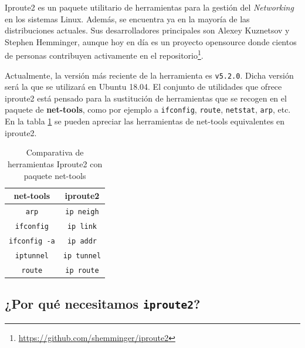 Iproute2 es un paquete utilitario de herramientas para la gestión del \textit{Networking} en los sistemas Linux. Además, se encuentra ya en la mayoría de las distribuciones actuales. Sus desarrolladores principales son Alexey Kuznetsov y Stephen Hemminger, aunque hoy en día es un proyecto opensource donde cientos de personas contribuyen activamente en el repositorio\footnote{\url{https://github.com/shemminger/iproute2}}.  \\
\par
Actualmente, la versión más reciente de la herramienta es \texttt{v5.2.0}. Dicha versión será la que se utilizará en Ubuntu 18.04. El conjunto de utilidades que ofrece iproute2 está pensado para la sustitución de herramientas que se recogen en el paquete de \textbf{net-tools}, como por ejemplo a \texttt{ifconfig}, \texttt{route}, \texttt{netstat}, \texttt{arp}, etc. En la tabla \ref{tab:ipNettools} se pueden apreciar las herramientas de net-tools equivalentes en iproute2.

\begin{table}[ht]
    \centering
    \begin{tabular}{|c|c|}
        \hline
        \rowcolor[HTML]{C0C0C0}
        {\color[HTML]{000000} \textbf{net-tools}} & {\color[HTML]{000000} \textbf{iproute2}} \\ \hline
        \texttt{arp}                              & \texttt{ip neigh}                        \\ \hline
        \texttt{ifconfig}                         & \texttt{ip link}                         \\ \hline
        \texttt{ifconfig -a}                      & \texttt{ip addr}                         \\ \hline
        \texttt{iptunnel}                         & \texttt{ip tunnel}                       \\ \hline
        \texttt{route}                            & \texttt{ip route}                        \\ \hline
    \end{tabular}
    \caption{Comparativa de herramientas Iproute2 con paquete net-tools}
    \label{tab:ipNettools}
\end{table}

\subsection{¿Por qué necesitamos \texttt{iproute2}?}

